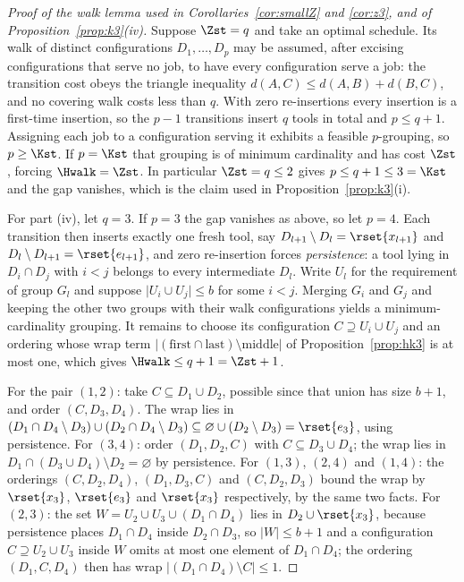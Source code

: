 \begin{proof}[Proof of the walk lemma used in Corollaries~\ref{cor:smallZ} and
\ref{cor:z3}, and of Proposition~\ref{prop:k3}(iv)]
Suppose $\Zst=q$ and take an optimal schedule. Its walk of distinct configurations
$D_1,\dots,D_p$ may be assumed, after excising configurations that serve no job, to
have every configuration serve a job: the transition cost obeys the triangle
inequality $d(A,C)\le d(A,B)+d(B,C)$, and no covering walk costs less than $q$. With
zero re-insertions every insertion is a first-time insertion, so the $p-1$ transitions
insert $q$ tools in total and $p\le q+1$. Assigning each job to a configuration
serving it exhibits a feasible $p$-grouping, so $p\ge\Kst$. If $p=\Kst$ that grouping
is of minimum cardinality and has cost $\Zst$, forcing $\Hwalk=\Zst$. In particular
$\Zst=q\le2$ gives $p\le q+1\le3=\Kst$ and the gap vanishes, which is the claim used
in Proposition~\ref{prop:k3}(i).

For part (iv), let $q=3$. If $p=3$ the gap vanishes as above, so let $p=4$. Each
transition then inserts exactly one fresh tool, say $D_{l+1}\setminus D_l=\rset{x_{l+1}}$
and $D_l\setminus D_{l+1}=\rset{e_{l+1}}$, and zero re-insertion forces
\emph{persistence}: a tool lying in $D_i\cap D_j$ with $i<j$ belongs to every
intermediate $D_l$. Write $U_l$ for the requirement of group $G_l$ and suppose
$\lvert U_i\cup U_j\rvert\le b$ for some $i<j$. Merging $G_i$ and $G_j$ and keeping the
other two groups with their walk configurations yields a minimum-cardinality grouping.
It remains to choose its configuration $C\supseteq U_i\cup U_j$ and an ordering whose
wrap term $\lvert(\text{first}\cap\text{last})\setminus\text{middle}\rvert$ of
Proposition~\ref{prop:hk3} is at most one, which gives $\Hwalk\le q+1=\Zst+1$.

For the pair $(1,2)$: take $C\subseteq D_1\cup D_2$, possible since that union has size
$b+1$, and order $(C,D_3,D_4)$. The wrap lies in
$(D_1\cap D_4\setminus D_3)\cup(D_2\cap D_4\setminus D_3)\subseteq\varnothing\cup(D_2\setminus D_3)=\rset{e_3}$,
using persistence. For $(3,4)$: order $(D_1,D_2,C)$ with $C\subseteq D_3\cup D_4$; the
wrap lies in $D_1\cap(D_3\cup D_4)\setminus D_2=\varnothing$ by persistence. For
$(1,3)$, $(2,4)$ and $(1,4)$: the orderings $(C,D_2,D_4)$, $(D_1,D_3,C)$ and
$(C,D_2,D_3)$ bound the wrap by $\rset{x_3}$, $\rset{e_3}$ and $\rset{x_3}$
respectively, by the same two facts. For $(2,3)$: the set
$W=U_2\cup U_3\cup(D_1\cap D_4)$ lies in $D_2\cup\rset{x_3}$, because persistence
places $D_1\cap D_4$ inside $D_2\cap D_3$, so $\lvert W\rvert\le b+1$ and a
configuration $C\supseteq U_2\cup U_3$ inside $W$ omits at most one element of
$D_1\cap D_4$; the ordering $(D_1,C,D_4)$ then has wrap
$\lvert(D_1\cap D_4)\setminus C\rvert\le1$.
\end{proof}

